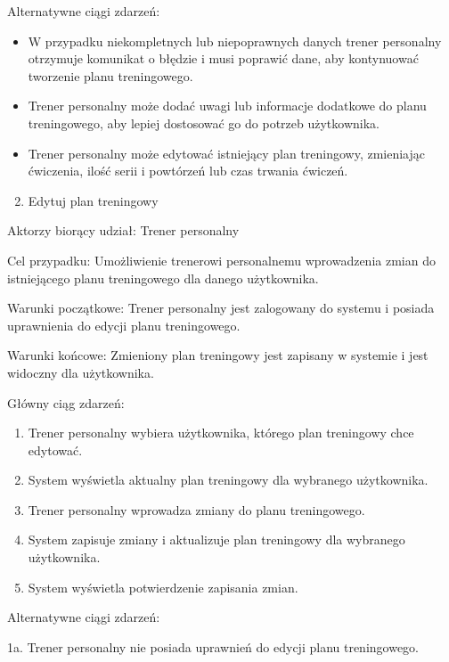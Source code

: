 \documentclass[
]{article}
\providecommand{\tightlist}{%
  \setlength{\itemsep}{0pt}\setlength{\parskip}{0pt}}
\begin{document}
{Alternatywne ciągi zdarzeń:}

\begin{itemize}
\tightlist
\item
  {W przypadku niekompletnych lub niepoprawnych danych trener personalny
  otrzymuje komunikat o błędzie i musi poprawić dane, aby kontynuować
  tworzenie planu treningowego.}
\item
  {Trener personalny może dodać uwagi lub informacje dodatkowe do planu
  treningowego, aby lepiej dostosować go do potrzeb użytkownika.}
\item
  {Trener personalny może edytować istniejący plan treningowy,
  zmieniając ćwiczenia, ilość serii i powtórzeń lub czas trwania
  ćwiczeń.}
\end{itemize}

{}

\begin{enumerate}
\setcounter{enumi}{1}
\tightlist
\item
  {Edytuj plan treningowy}
\end{enumerate}

{Aktorzy biorący udział: Trener personalny}

{Cel przypadku: Umożliwienie trenerowi personalnemu wprowadzenia zmian
do istniejącego planu treningowego dla danego użytkownika.}

{Warunki początkowe: Trener personalny jest zalogowany do systemu i
posiada uprawnienia do edycji planu treningowego.}

{Warunki końcowe: Zmieniony plan treningowy jest zapisany w systemie i
jest widoczny dla użytkownika.}

{Główny ciąg zdarzeń:}

\begin{enumerate}
\tightlist
\item
  {Trener personalny wybiera użytkownika, którego plan treningowy chce
  edytować.}
\item
  {System wyświetla aktualny plan treningowy dla wybranego użytkownika.}
\item
  {Trener personalny wprowadza zmiany do planu treningowego.}
\item
  {System zapisuje zmiany i aktualizuje plan treningowy dla wybranego
  użytkownika.}
\item
  {System wyświetla potwierdzenie zapisania zmian.}
\end{enumerate}

{Alternatywne ciągi zdarzeń:}

{1a. Trener personalny nie posiada uprawnień do edycji planu
treningowego.}
\end{document}
